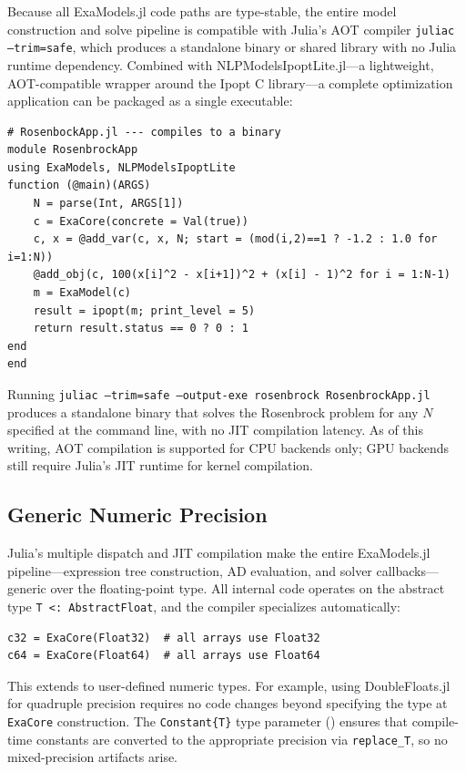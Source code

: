 \documentclass[11pt]{article}
\begin{document}
Because all ExaModels.jl code paths are type-stable, the entire model construction and solve pipeline is compatible with Julia's AOT compiler \texttt{juliac --trim=safe}, which produces a standalone binary or shared library with no Julia runtime dependency. Combined with NLPModelsIpoptLite.jl---a lightweight, AOT-compatible wrapper around the Ipopt C library---a complete optimization application can be packaged as a single executable:
\begin{lstlisting}
# RosenbockApp.jl --- compiles to a binary
module RosenbrockApp
using ExaModels, NLPModelsIpoptLite
function (@main)(ARGS)
    N = parse(Int, ARGS[1])
    c = ExaCore(concrete = Val(true))
    c, x = @add_var(c, x, N; start = (mod(i,2)==1 ? -1.2 : 1.0 for i=1:N))
    @add_obj(c, 100(x[i]^2 - x[i+1])^2 + (x[i] - 1)^2 for i = 1:N-1)
    m = ExaModel(c)
    result = ipopt(m; print_level = 5)
    return result.status == 0 ? 0 : 1
end
end
\end{lstlisting}
Running \texttt{juliac --trim=safe --output-exe rosenbrock RosenbrockApp.jl} produces a standalone binary that solves the Rosenbrock problem for any $N$ specified at the command line, with no JIT compilation latency. As of this writing, AOT compilation is supported for CPU backends only; GPU backends still require Julia's JIT runtime for kernel compilation.

\subsection{Generic Numeric Precision}
\label{sec:aot:precision}

Julia's multiple dispatch and JIT compilation make the entire ExaModels.jl pipeline---expression tree construction, AD evaluation, and solver callbacks---generic over the floating-point type. All internal code operates on the abstract type \texttt{T <: AbstractFloat}, and the compiler specializes automatically:
\begin{lstlisting}
c32 = ExaCore(Float32)  # all arrays use Float32
c64 = ExaCore(Float64)  # all arrays use Float64
\end{lstlisting}
This extends to user-defined numeric types. For example, using DoubleFloats.jl for quadruple precision requires no code changes beyond specifying the type at \texttt{ExaCore} construction. The \texttt{Constant\{T\}} type parameter () ensures that compile-time constants are converted to the appropriate precision via \texttt{replace\_T}, so no mixed-precision artifacts arise.
\end{document}
